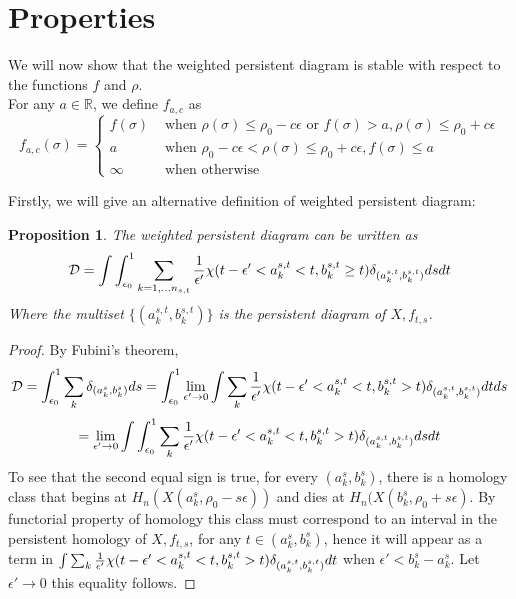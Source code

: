 \documentclass[11pt]{article}
\theoremstyle{plain}
\newtheorem{prop}[theorem]{Proposition}
\theoremstyle{definition}
\theoremstyle{definition}
\theoremstyle{definition}
\theoremstyle{definition}
\theoremstyle{definition}
\theoremstyle{definition}
\theoremstyle{definition}
\theoremstyle{definition}
\begin{document}
\section{Properties}

We will now show that the weighted persistent diagram is stable with respect to the functions $f$ and $\rho$. \\

For any $a\in \mathbb{R}$, we define $f_{a,c}$ as
\begin{equation}
f_{a,c}(\sigma)=\begin{cases} f(\sigma) &\text{ when }\rho(\sigma)\leq \rho_0-c\epsilon\text{ or }f(\sigma)>a, \rho(\sigma)\leq\rho_0+c\epsilon\\ a &\text{ when }\rho_0-c\epsilon<\rho(\sigma)\leq\rho_0+c\epsilon, f(\sigma)\leq a\\ \infty &\text{ when otherwise}\end{cases}
\end{equation}

Firstly, we will give an alternative definition of weighted persistent diagram:

\begin{prop}The weighted persistent diagram can be written as
\begin{equation}
\mathcal{D}=\int\int_{\epsilon_0}^1\sum_{k=1,\dots n_{s,t}}{1\over\epsilon'}\chi(t-\epsilon'<a_k^{s,t}<t, b_k^{s,t}\geq t)\delta_{(a_k^{s,t}, b_k^{s,t})}dsdt
\end{equation}
Where the multiset $\{(a_k^{s,t}, b_k^{s,t})\}$ is the persistent diagram of $X, f_{t,s}$.
\end{prop}

\begin{proof}

By Fubini's theorem,
  \[\mathcal{D}=\int_{\epsilon_0}^1\sum_k\delta_{(a_k^{s}, b_k^{s})}ds=\int_{\epsilon_0}^1\lim_{\epsilon'\rightarrow 0}\int\sum_k{1\over\epsilon'}\chi(t-\epsilon'<a_k^{s,t}<t, b_k^{s,t}>t)\delta_{(a_k^{s,t}, b_k^{s,t})}dt ds\]
  \[=\lim_{\epsilon'\rightarrow 0}\int\int_{\epsilon_0}^1\sum_k{1\over\epsilon'}\chi(t-\epsilon'<a_k^{s,t}<t, b_k^{s,t}>t)\delta_{(a_k^{s,t}, b_k^{s,t})}dsdt\]
  To see that the second equal sign is true, for every $(a_k^s, b_k^s)$, there is a homology class that begins at $H_n(X(a_k^s,\rho_0-s\epsilon))$ and dies at $H_n(X(b_k^s, \rho_0+s\epsilon)$. By functorial property of homology this class must correspond to an interval in the persistent homology of $X, f_{t,s}$, for any $t\in (a_k^s, b_k^s)$, hence it will appear as a term in $\int\sum_k{1\over\epsilon'}\chi(t-\epsilon'<a_k^{s,t}<t, b_k^{s,t}>t)\delta_{(a_k^{s,t}, b_k^{s,t})}dt$ when $\epsilon'<b_k^s-a_k^s$. Let $\epsilon'\rightarrow 0$ this equality follows.
\end{proof}
\end{document}
